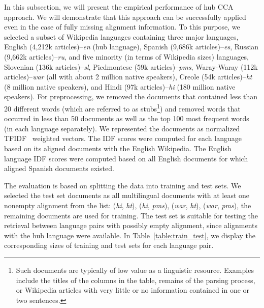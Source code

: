 In this subsection, we will present the empirical performance of hub CCA approach. 
We will demonstrate that this approach can be successfully applied even in the case of 
fully missing alignment information.
To this purpose, we selected a subset of Wikipedia languages containing three major languages, 
English (4,212k articles)--\emph{en} (hub language), Spanish (9,686k articles)--\emph{es}, 
Russian (9,662k articles)--\emph{ru}, and five minority (in terms of Wikipedia sizes) languages, 
Slovenian (136k articles)--\emph{sl}, Piedmontese (59k articles)--\emph{pms}, 
Waray-Waray (112k articles)--\emph{war} (all with about 2 million native speakers), 
Creole (54k articles)--\emph{ht} (8 million native speakers), and Hindi 
(97k articles)--\emph{hi} (180 million native speakers). For preprocessing, we removed the documents that contained 
less than 20 different words (which are referred to as stubs\footnote{Such documents are typically of low value as a linguistic resource. 
Examples include the titles of the columns in the table, remains of the parsing process, 
or Wikipedia articles with very little or no information contained in one or two sentences.}) and removed words that occurred in 
less than 50 documents as well as the top 100 most frequent words (in each language separately). We represented the documents as 
normalized TFIDF~\cite{Salton88term-weightingapproaches} weighted vectors. The IDF scores were computed for each language based 
on its aligned documents with the English Wikipedia. The English language IDF scores were computed based on all English documents 
for which aligned Spanish documents existed.

The evaluation is based on splitting the data into training and test sets.
We selected the test set documents as all multilingual documents with at least one nonempty alignment 
from the list: (\emph{hi}, \emph{ht}), (\emph{hi}, \emph{pms}), (\emph{war}, \emph{ht}), (\emph{war}, \emph{pms}),
the remaining documents are used for training.
The test set is suitable for testing the retrieval between language pairs with possibly empty alignment, since alignments with the hub
language were available. 
In Table~\ref{table:train_test}, we display the corresponding sizes of training and test sets for each language pair.

